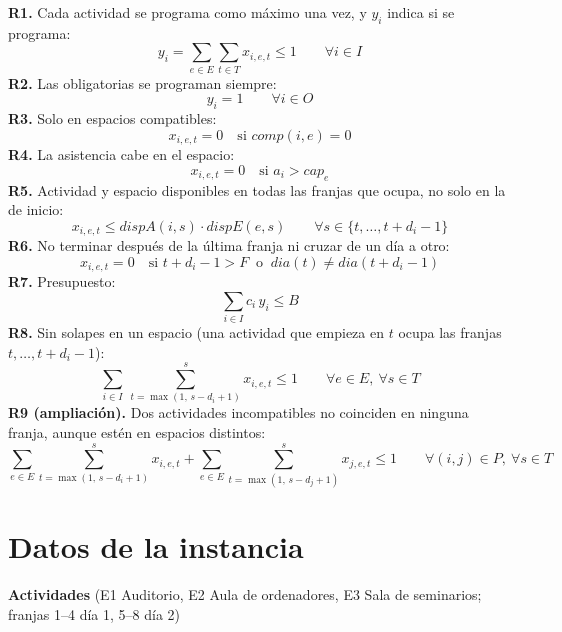 \textbf{R1.} Cada actividad se programa como m\'aximo una vez, y $y_i$ indica si se programa:
\[ y_i=\sum_{e\in E}\sum_{t\in T}x_{i,e,t}\le 1\qquad\forall i\in I \]
\textbf{R2.} Las obligatorias se programan siempre:
\[ y_i=1\qquad\forall i\in O \]
\textbf{R3.} Solo en espacios compatibles:
\[ x_{i,e,t}=0\quad\text{si } comp(i,e)=0 \]
\textbf{R4.} La asistencia cabe en el espacio:
\[ x_{i,e,t}=0\quad\text{si } a_i>cap_e \]
\textbf{R5.} Actividad y espacio disponibles en todas las franjas que ocupa, no solo en la de inicio:
\[ x_{i,e,t}\le dispA(i,s)\cdot dispE(e,s)\qquad\forall s\in\{t,\dots,t+d_i-1\} \]
\textbf{R6.} No terminar despu\'es de la \'ultima franja ni cruzar de un d\'ia a otro:
\[ x_{i,e,t}=0\quad\text{si } t+d_i-1>F \ \text{ o } \ dia(t)\neq dia(t+d_i-1) \]
\textbf{R7.} Presupuesto:
\[ \sum_{i\in I}c_i\,y_i\le B \]
\textbf{R8.} Sin solapes en un espacio (una actividad que empieza en $t$ ocupa las franjas $t,\dots,t+d_i-1$):
\[ \sum_{i\in I}\ \sum_{t=\max(1,\,s-d_i+1)}^{s}x_{i,e,t}\le 1\qquad\forall e\in E,\ \forall s\in T \]
\textbf{R9 (ampliaci\'on).} Dos actividades incompatibles no coinciden en ninguna franja, aunque est\'en en espacios distintos:
\[ \sum_{e\in E}\sum_{t=\max(1,\,s-d_i+1)}^{s}x_{i,e,t}+\sum_{e\in E}\sum_{t=\max(1,\,s-d_j+1)}^{s}x_{j,e,t}\le 1\qquad\forall (i,j)\in P,\ \forall s\in T \]

\clearpage
\appendix
\section{Datos de la instancia}
\textbf{Actividades} (E1 Auditorio, E2 Aula de ordenadores, E3 Sala de seminarios; franjas 1--4 d\'ia 1, 5--8 d\'ia 2)

